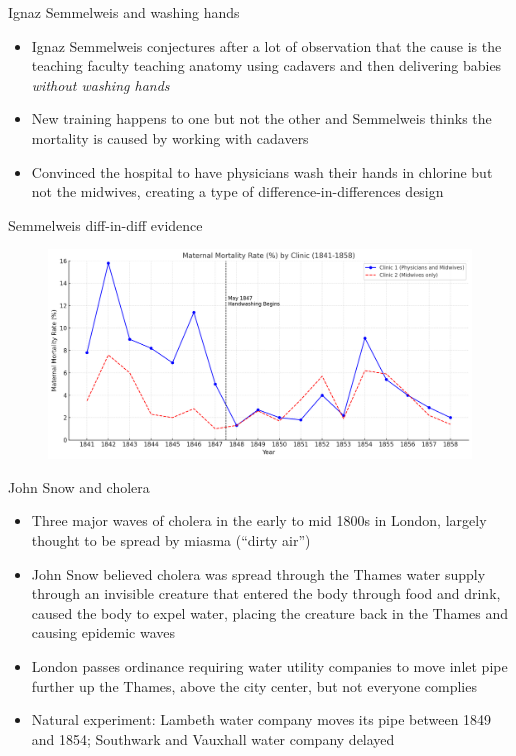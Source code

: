 \documentclass{beamer}
\begin{document}
\begin{frame}{Ignaz Semmelweis and washing hands}

\begin{itemize}
\item Ignaz Semmelweis conjectures after a lot of observation that the cause is the teaching faculty teaching anatomy using cadavers and then delivering babies \emph{without washing hands}
\item New training happens to one but not the other and Semmelweis thinks the mortality is caused by working with cadavers
\item Convinced the hospital to have physicians wash their hands in chlorine but not the midwives, creating a type of difference-in-differences design 
\end{itemize}

\end{frame}

\begin{frame}{Semmelweis diff-in-diff evidence}

	\begin{figure}
	\includegraphics[scale=0.4]{./lecture_includes/semmelweis_graphic.png}
	\end{figure}


\end{frame}



\begin{frame}{John Snow and cholera}

\begin{itemize}
\item Three major waves of cholera in the early to mid 1800s in London, largely thought to be spread by miasma (``dirty air'')
\item John Snow believed cholera was spread through the Thames water supply through an invisible creature that entered the body through food and drink, caused the body to expel water, placing the creature back in the Thames and causing epidemic waves
\item London passes ordinance requiring water utility companies to move inlet pipe further up the Thames, above the city center, but not everyone complies
\item Natural experiment: Lambeth water company moves its pipe between 1849 and 1854; Southwark and Vauxhall water company delayed
\end{itemize}

\end{frame}
\end{document}
